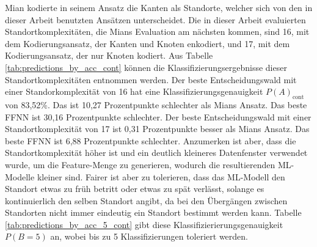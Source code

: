 \newline
\newline
Mian kodierte in seinem Ansatz die Kanten als Standorte, welcher sich von den in dieser Arbeit benutzten Ansätzen unterscheidet.
Die in dieser Arbeit evaluierten Standortkomplexitäten, die Mians Evaluation am nächsten kommen, sind 16, mit dem Kodierungsansatz, der Kanten und Knoten enkodiert,
und 17, mit dem Kodierungsansatz, der nur Knoten kodiert.
\newline
\newline
Aus Tabelle \ref{tab:predictions_by_acc_cont} können die Klassifizierungsergebnisse dieser Standortkomplexitäten entnommen werden.
Der beste Entscheidungswald mit einer Standorkomplexität von 16 hat eine Klassifizierungsgenauigkeit $P(A)_{\text{cont}}$ von 83,52\%.
Das ist 10,27 Prozentpunkte schlechter als Mians Ansatz.
Das beste FFNN ist 30,16 Prozentpunkte schlechter.
Der beste Entscheidungswald mit einer Standortkomplexität von 17 ist 0,31 Prozentpunkte besser als Mians Ansatz.
Das beste FFNN ist 6,88 Prozentpunkte schlechter.
Anzumerken ist aber, dass die Standortkomplexität höher ist und ein deutlich kleineres Datenfenster verwendet wurde,
um die Feature-Menge zu generieren, wodurch die resultierenden ML-Modelle kleiner sind.
\newline
\newline
Fairer ist aber zu tolerieren, dass das ML-Modell den Standort etwas zu früh betritt oder etwas zu spät verlässt,
solange es kontinuierlich den selben Standort angibt, da bei den Übergängen zwischen Standorten nicht immer eindeutig ein Standort bestimmt werden kann.
Tabelle \ref{tab:predictions_by_acc_5_cont} gibt diese Klassifizierierungsgenauigkeit $P(B=5)$ an, wobei bis zu 5 Klassifizierungen toleriert werden.
